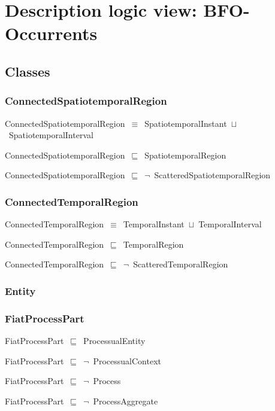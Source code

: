 \documentclass{article}
\begin{document}
\section*{Description logic view: BFO-Occurrents}
\subsection*{Classes}

\subsubsection*{ConnectedSpatiotemporalRegion}

ConnectedSpatiotemporalRegion~\ensuremath{\equiv}~SpatiotemporalInstant~\ensuremath{\sqcup}~SpatiotemporalInterval

ConnectedSpatiotemporalRegion~\ensuremath{\sqsubseteq}~SpatiotemporalRegion~

ConnectedSpatiotemporalRegion~\ensuremath{\sqsubseteq}~\ensuremath{\lnot}~ScatteredSpatiotemporalRegion

\subsubsection*{ConnectedTemporalRegion}

ConnectedTemporalRegion~\ensuremath{\equiv}~TemporalInstant~\ensuremath{\sqcup}~TemporalInterval

ConnectedTemporalRegion~\ensuremath{\sqsubseteq}~TemporalRegion~

ConnectedTemporalRegion~\ensuremath{\sqsubseteq}~\ensuremath{\lnot}~ScatteredTemporalRegion

\subsubsection*{Entity}

\subsubsection*{FiatProcessPart}

FiatProcessPart~\ensuremath{\sqsubseteq}~ProcessualEntity~

FiatProcessPart~\ensuremath{\sqsubseteq}~\ensuremath{\lnot}~ProcessualContext

FiatProcessPart~\ensuremath{\sqsubseteq}~\ensuremath{\lnot}~Process

FiatProcessPart~\ensuremath{\sqsubseteq}~\ensuremath{\lnot}~ProcessAggregate
\end{document}
